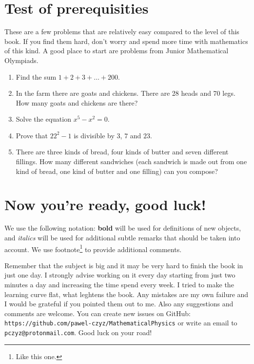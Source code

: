 \section{Test of prerequisities}
These are a few problems that are relatively easy compared to the level of this book. If you find them hard, don't worry and spend more time with mathematics of this kind. A good place to start are problems from Junior Mathematical Olympiads.
\begin{enumerate}
  \item Find the sum $1+2+3+\dots+200$.
  \item In the farm there are goats and chickens. There are 28 heads and 70 legs. How many goats and chickens are there?
  \item Solve the equation $x^5-x^2=0$.
  \item Prove that $22^2-1$ is divisible by $3$, $7$ and $23$.
  \item There are three kinds of bread, four kinds of butter and seven different fillings. How many different sandwiches (each sandwich is made out from one kind of bread, one kind of butter and one filling) can you compose?
\end{enumerate}

\section{Now you're ready, good luck!}
We use the following notation: \textbf{bold} will be used for definitions of new objects, and \textit{italics} will be used for additional subtle remarks that should be taken into
account. We use footnote\footnote{Like this one.} to provide additional comments.

Remember that the subject is big and it may be very hard to finish the book in just one day. I strongly advise working on it every day starting from just two minutes a day
and increasing the time spend every week. I tried to make the learning curve flat, what leghtens the book.
Any mistakes are my own failure and I would be grateful if you pointed them out to me. Also any suggestions and comments are welcome. You can
create new issues on GitHub: \texttt{https://github.com/pawel-czyz/MathematicalPhysics} or write an email to \texttt{pczyz@protonmail.com}.
Good luck on your road!
